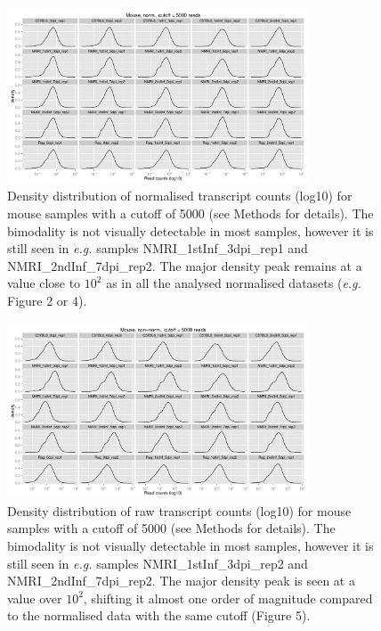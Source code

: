 \documentclass{article}
\begin{document}
\begin{figure}[h]
\begin{center}
\includegraphics[width=0.8\textwidth]{distributions_normmouse5000} %
\caption{Density distribution of normalised transcript counts (log10)
  for mouse samples with a cutoff of 5000 (see Methods for
  details). The bimodality is not visually detectable in most samples,
  however it is still seen in \textit{e.g.} samples
  NMRI\_1stInf\_3dpi\_rep1 and NMRI\_2ndInf\_7dpi\_rep2. The major
  density peak remains at a value close to $10^2$ as in all the
  analysed normalised datasets (\textit{e.g.} Figure 2 or 4).}
\end{center}
\end{figure}

\begin{figure}[h]
\begin{center}
\includegraphics[width=0.8\textwidth]{distributions_mouse5000} %
\caption{Density distribution of raw transcript counts (log10) for
  mouse samples with a cutoff of 5000 (see Methods for details). The
  bimodality is not visually detectable in most samples, however it is
  still seen in \textit{e.g.} samples NMRI\_1stInf\_3dpi\_rep2 and
  NMRI\_2ndInf\_7dpi\_rep2. The major density peak is seen at a value
  over $10^2$, shifting it almost one order of magnitude compared to
  the normalised data with the same cutoff (Figure 5).}
\end{center}
\end{figure}
\end{document}
